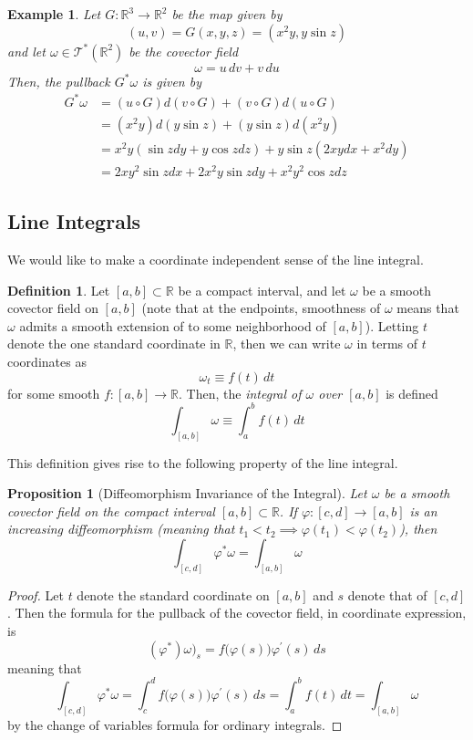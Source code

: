 \documentclass{article}
\newtheorem{proposition}[theorem]{Proposition}
\newtheorem{example}{Example}[section]
\theoremstyle{remark}
\theoremstyle{definition}
\newtheorem{definition}{Definition}[section]
\begin{document}
\begin{example}
Let $G: \mathbb{R}^3 \longrightarrow \mathbb{R}^2$ be the map given by 
\[(u, v) = G(x, y, z) = (x^2 y, y \sin{z})\]
and let $\omega \in \mathcal{T}^*(\mathbb{R}^2)$ be the covector field 
\[\omega = u \,dv + v\,du\]
Then, the pullback $G^* \omega$ is given by 
\begin{align*}
    G^* \omega & = (u \circ G) d(v \circ G) + (v \circ G) d (u \circ G) \\
    & = (x^2 y) d(y \sin{z}) + (y \sin{z}) d (x^2 y) \\
    & = x^2 y (\sin{z} dy + y \cos{z} dz) + y \sin{z} (2xy dx + x^2 dy) \\
    & = 2xy^2 \sin{z} dx + 2x^2 y \sin{z} dy + x^2 y^2 \cos{z} dz
\end{align*}
\end{example}

\subsection{Line Integrals}
We would like to make a coordinate independent sense of the line integral. 

\begin{definition}
Let $[a, b] \subset \mathbb{R}$ be a compact interval, and let $\omega$ be a smooth covector field on $[a,b]$ (note that at the endpoints, smoothness of $\omega$ means that $\omega$ admits a smooth extension of to some neighborhood of $[a,b]$). Letting $t$ denote the one standard coordinate in $\mathbb{R}$, then we can write $\omega$ in terms of $t$ coordinates as 
\[\omega_t \equiv f(t)\,dt\]
for some smooth $f: [a,b] \longrightarrow \mathbb{R}$. Then, the \textit{integral of $\omega$ over $[a,b]$} is defined 
\[\int_{[a,b]} \omega \equiv \int_a^b f(t)\,dt\]
\end{definition}

This definition gives rise to the following property of the line integral. 

\begin{proposition}[Diffeomorphism Invariance of the Integral]
Let $\omega$ be a smooth covector field on the compact interval $[a,b] \subset \mathbb{R}$. If $\varphi: [c,d] \longrightarrow [a,b]$ is an increasing diffeomorphism (meaning that $t_1 < t_2 \implies \varphi(t_1) < \varphi(t_2)$), then
\[\int_{[c,d]} \varphi^* \omega = \int_{[a,b]} \omega\]
\end{proposition}
\begin{proof}
Let $t$ denote the standard coordinate on $[a,b]$ and $s$ denote that of $[c,d]$. Then the formula for the pullback of the covector field, in coordinate expression, is
\[(\varphi^*) \omega)_s = f\big(\varphi(s)\big) \varphi^\prime (s)\,ds\]
meaning that 
\[\int_{[c,d]} \varphi^* \omega = \int_c^d f\big( \varphi(s) \big) \varphi^\prime (s) \,ds = \int_a^b f(t)\,dt = \int_{[a,b]} \omega\]
by the change of variables formula for ordinary integrals. 
\end{proof}
\end{document}
